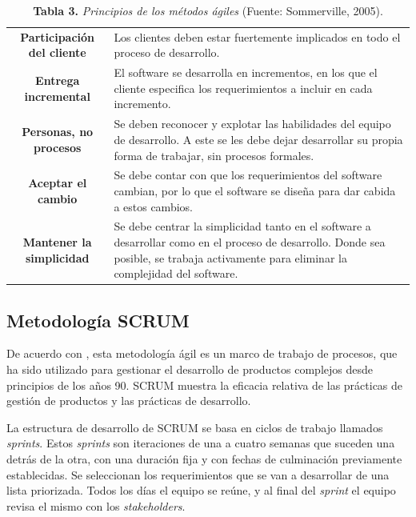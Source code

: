 \FloatBarrier %
\vline
	\begin{table}[htb]
		\small
		\caption{\textbf{Tabla 3.} \textit{Principios de los m\'{e}todos \'{a}giles} (Fuente: Sommerville, 2005).}
		\centering
		\setlength{\extrarowheight}{5pt}
		\begin{tabulary}{15cm}{|c|L|}
			\hline
			 & \\ \hline
			\textbf{Participaci\'{o}n del cliente} & Los clientes deben estar fuertemente implicados en todo el proceso de desarrollo.\\ \hline
			\textbf{Entrega incremental} & El software se desarrolla en incrementos, en los que el cliente especifica los requerimientos a incluir en cada incremento.\\ \hline
			\textbf{Personas, no procesos} & Se deben reconocer y explotar las habilidades del equipo de desarrollo. A este se les debe dejar desarrollar su propia forma de trabajar, sin procesos formales.\\ \hline
			\textbf{Aceptar el cambio} & Se debe contar con que los requerimientos del software cambian, por lo que el software se dise\~{n}a para dar cabida a estos cambios.\\ \hline
			\textbf{Mantener la simplicidad} & Se debe centrar la simplicidad tanto en el software a desarrollar como en el proceso de desarrollo. Donde sea posible, se trabaja activamente para eliminar la complejidad del software.\\ \hline
		\end{tabulary}
	\end{table}
\FloatBarrier %

		\subsection{Metodolog\'{i}a SCRUM}
De acuerdo con \cite{Schwaber&Sutherland}, esta metodolog\'{i}a \'{a}gil es un marco de trabajo de procesos, que ha sido utilizado para gestionar el desarrollo de productos complejos desde principios de los a\~{n}os 90. SCRUM muestra la eficacia relativa de las pr\'{a}cticas de gesti\'{o}n de productos y las pr\'{a}cticas de desarrollo.

La estructura de desarrollo de SCRUM se basa en ciclos de trabajo llamados \textit{sprints}. Estos \textit{sprints} son iteraciones de una a cuatro semanas que suceden una detr\'{a}s de la otra, con una duraci\'{o}n fija y con fechas de culminaci\'{o}n previamente establecidas. Se seleccionan los requerimientos que se van a desarrollar de una lista priorizada. Todos los d\'{i}as el equipo se re\'{u}ne, y al final del \textit{sprint} el equipo revisa el mismo con los \textit{stakeholders}.

